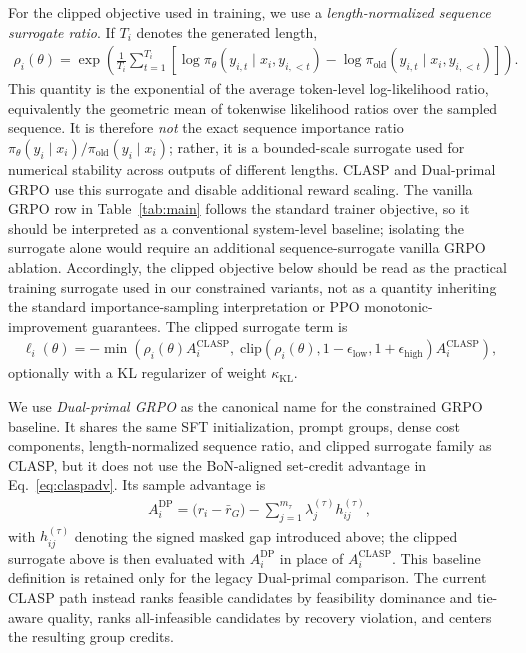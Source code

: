 \documentclass{article}
\theoremstyle{remark}
\begin{document}
For the clipped objective used in training, we use a \emph{length-normalized sequence surrogate ratio}. If \(T_i\) denotes the generated length,
\begin{align}
\rho_i(\theta) =
\exp\left(
\frac{1}{T_i}
\sum_{t=1}^{T_i}
\left[
\log \pi_\theta(y_{i,t} \mid x_i, y_{i,<t})
-
\log \pi_{\mathrm{old}}(y_{i,t} \mid x_i, y_{i,<t})
\right]
\right).
\label{eq:seqratio}
\end{align}
This quantity is the exponential of the average token-level log-likelihood ratio, equivalently the geometric mean of tokenwise likelihood ratios over the sampled sequence. It is therefore \emph{not} the exact sequence importance ratio \(\pi_\theta(y_i\mid x_i)/\pi_{\mathrm{old}}(y_i\mid x_i)\); rather, it is a bounded-scale surrogate used for numerical stability across outputs of different lengths. CLASP and Dual-primal GRPO use this surrogate and disable additional reward scaling. The vanilla GRPO row in Table~\ref{tab:main} follows the standard trainer objective, so it should be interpreted as a conventional system-level baseline; isolating the surrogate alone would require an additional sequence-surrogate vanilla GRPO ablation. Accordingly, the clipped objective below should be read as the practical training surrogate used in our constrained variants, not as a quantity inheriting the standard importance-sampling interpretation or PPO monotonic-improvement guarantees.
The clipped surrogate term is
\begin{align}
\ell_i(\theta) =
-\min\left(
\rho_i(\theta) A_i^{\mathrm{CLASP}},\;
\mathrm{clip}\!\left(\rho_i(\theta), 1-\epsilon_{\mathrm{low}}, 1+\epsilon_{\mathrm{high}}\right) A_i^{\mathrm{CLASP}}
\right),
\label{eq:clipsurrogate}
\end{align}
optionally with a KL regularizer of weight \(\kappa_{\mathrm{KL}}\).

We use \emph{Dual-primal GRPO} as the canonical name for the constrained GRPO baseline. It shares the same SFT initialization, prompt groups, dense cost components, length-normalized sequence ratio, and clipped surrogate family as CLASP, but it does not use the BoN-aligned set-credit advantage in Eq.~\eqref{eq:claspadv}. Its sample advantage is
\begin{align}
A_i^{\mathrm{DP}}
=
\bigl(r_i-\bar r_G\bigr)
-
\sum_{j=1}^{m_\tau}\lambda_j^{(\tau)} h_{ij}^{(\tau)},
\label{eq:dualprimalbaseline}
\end{align}
with \(h_{ij}^{(\tau)}\) denoting the signed masked gap introduced above; the clipped surrogate above is then evaluated with \(A_i^{\mathrm{DP}}\) in place of \(A_i^{\mathrm{CLASP}}\). This baseline definition is retained only for the legacy Dual-primal comparison. The current CLASP path instead ranks feasible candidates by feasibility dominance and tie-aware quality, ranks all-infeasible candidates by recovery violation, and centers the resulting group credits.
\end{document}
